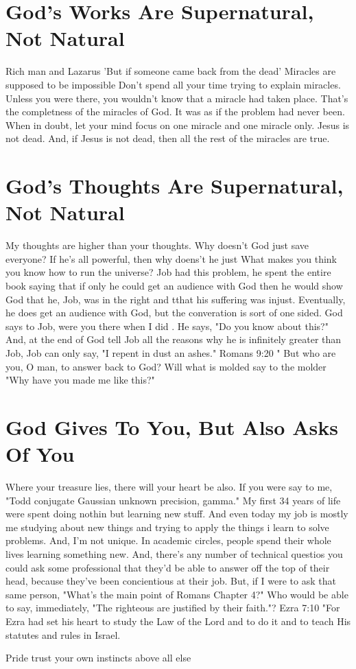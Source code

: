 \documentclass{tufte-handout}
\begin{document}
\section{God's Works Are Supernatural, Not Natural}
Rich man and Lazarus 'But if someone came back from the dead'
Miracles are supposed to be impossible
Don't spend all your time trying to explain miracles.  Unless you were there, you wouldn't know that a miracle had taken place.  That's the completness of the miracles of God.  It was as if the problem had never been.
When in doubt, let your mind focus on one miracle and one miracle only.  Jesus is not dead.  And, if Jesus is not dead, then all the rest of the miracles are true.

\section{God's Thoughts Are Supernatural, Not Natural}
My thoughts are higher than your thoughts.
Why doesn't God just save everyone?  If he's all powerful, then why doens't he just 
What makes you think you know how to run the universe?
Job had this problem, he spent the entire book saying that if only he could get an audience with God then he would show God that he, Job, was in the right and tthat his suffering was injust.  Eventually, he does get an audience with God, but the converation is sort of one sided.  God says to Job, were you there when I did . He says, "Do you know about this?" And, at the end of God tell Job all the reasons why he is infinitely greater than Job, Job can only say, "I repent in dust an ashes."
Romans 9:20 " But who are you, O man, to answer back to God? Will what is molded say to the molder "Why have you made me like this?"

\section{God Gives To You, But Also Asks Of You} 
Where your treasure lies, there will your heart be also.
If you were say to me, "Todd conjugate Gaussian unknown precision, gamma."
My first 34 years of life were spent doing nothin but learning new stuff.  And even today my job is mostly me studying about new things and trying to apply the things i learn to solve problems.  And, I'm not unique.  In academic circles, people spend their whole lives learning something new.  And, there's any number of technical questios you could ask some professional that they'd be able to answer off the top of their head, because they've been concientious at their job.  But, if I were to ask that same person, "What's the main point of Romans Chapter 4?"  Who would be able to say, immediately, "The righteous are justified by their faith."?
Ezra 7:10 "For Ezra had set his heart to study the Law of the Lord and to do it and to teach His statutes and rules in Israel.

Pride
trust your own instincts above all else
\end{document}
